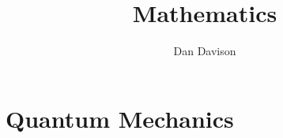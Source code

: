 \documentclass{book}
\title{Mathematics}
\author{Dan Davison}
\begin{document}


% 

% 

% 

% 
% 



% 
% 

% 

% 

% 

\chapter{Quantum Mechanics}


% 
% 
\end{document}
